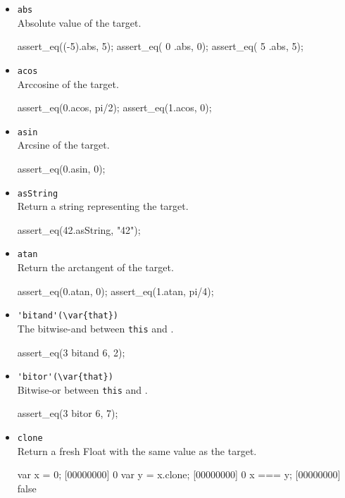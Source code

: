 \begin{itemize}
\item \lstinline|abs|\\
  Absolute value of the target.
\begin{urbiscript}[firstnumber=last]
assert_eq((-5).abs, 5);
assert_eq(  0 .abs, 0);
assert_eq(  5 .abs, 5);
\end{urbiscript}

\item \lstinline|acos|\\
  Arccosine of the target.
\begin{urbiscript}[firstnumber=last]
assert_eq(0.acos, pi/2);
assert_eq(1.acos, 0);
\end{urbiscript}

\item \lstinline|asin|\\
  Arcsine of the target.
\begin{urbiscript}[firstnumber=last]
assert_eq(0.asin, 0);
\end{urbiscript}

\item \lstinline|asString|\\
  Return a string representing the target.
\begin{urbiscript}[firstnumber=last]
assert_eq(42.asString, "42");
\end{urbiscript}

\item \lstinline|atan|\\
  Return the arctangent of the target.
\begin{urbiscript}[firstnumber=last]
assert_eq(0.atan, 0);
assert_eq(1.atan, pi/4);
\end{urbiscript}

\item \lstinline|'bitand'(\var{that})|\\
  The bitwise-and between \lstinline|this| and .
\begin{urbiscript}[firstnumber=last]
assert_eq(3 bitand 6, 2);
\end{urbiscript}

\item \lstinline|'bitor'(\var{that})|\\
  Bitwise-or between \lstinline|this| and .
\begin{urbiscript}[firstnumber=last]
assert_eq(3 bitor 6, 7);
\end{urbiscript}

\item \lstinline|clone|\\
  Return a fresh Float with the same value as the target.
\begin{urbiscript}[firstnumber=last]
var x = 0;
[00000000] 0
var y = x.clone;
[00000000] 0
x === y;
[00000000] false
\end{urbiscript}


\end{itemize}
